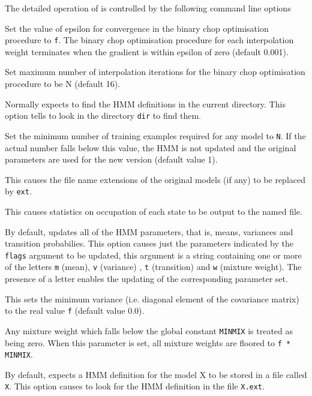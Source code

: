 The detailed operation of  is controlled by the following
command line options
\begin{optlist}
    Set the value of epsilon for convergence 
      in the binary chop  optimisation procedure to {\tt f}.
       The binary chop  optimisation procedure for each
       interpolation weight terminates when the gradient is
       within epsilon of zero (default 0.001).
  
    Set maximum number of interpolation iterations
       for the binary chop  optimisation procedure to be N
       (default 16).

 Normally  expects to find the HMM definitions
      in the current directory.  This option tells  to look in
      the directory {\tt dir} to find them.


     Set the minimum number of training examples 
    required for any model to {\tt N}.  If the actual number
    falls below this value, the HMM is not updated and the original
    parameters are used for the new version (default value 1).

    This causes the file name extensions of the
      original models (if any) to be replaced by {\tt ext}.

   This causes statistics on occupation of each
      state to be output to the named file.  
      
   By default,  updates all of the HMM parameters,
      that is, means, variances and transition probabilies. This 
      option causes just the parameters indicated by the {\tt flags}
      argument to be updated, this argument is a string containing one
      or more of the letters {\tt m} (mean), {\tt v} (variance) ,
      {\tt t} (transition) and {\tt w} (mixture weight).  The 
      presence of a letter enables
      the updating of the corresponding parameter set.

    This sets the minimum variance (i.e. diagonal element of
      the covariance matrix) to the real value {\tt f} (default value
      0.0).
  
    Any mixture weight which falls below the global
            constant {\tt MINMIX} is treated as being zero.
      When this parameter is  set,  all mixture weights  are floored
      to {\tt f * MINMIX}.
     
    By default,  expects a HMM definition for 
      the model X to be stored in a file called {\tt X}.  This
      option causes  to look for the HMM definition in the
      file {\tt X.ext}.

\stdoptB
\stdoptH
\stdoptM

\end{optlist}

